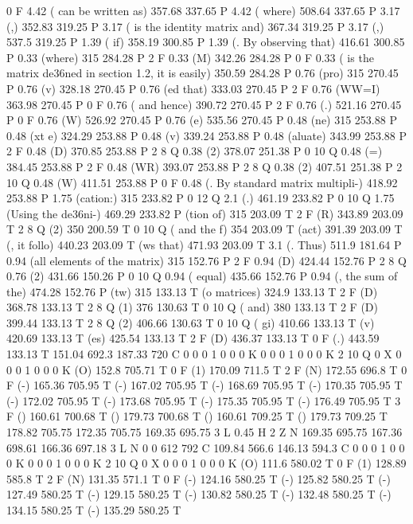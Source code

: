 0 F
4.42 ( can be written as) 357.68 337.65 P
4.42 ( where) 508.64 337.65 P
3.17 (,) 352.83 319.25 P
3.17 ( is the identity matrix and) 367.34 319.25 P
3.17 (,) 537.5 319.25 P
1.39 ( if) 358.19 300.85 P
1.39 (. By observing that) 416.61 300.85 P
0.33 (where) 315 284.28 P
2 F
0.33 (M) 342.26 284.28 P
0 F
0.33 ( is the matrix de\336ned in section 1.2, it is easily) 350.59 284.28 P
0.76 (pro) 315 270.45 P
0.76 (v) 328.18 270.45 P
0.76 (ed that) 333.03 270.45 P
2 F
0.76 (WW=I) 363.98 270.45 P
0 F
0.76 ( and hence) 390.72 270.45 P
2 F
0.76 (.) 521.16 270.45 P
0 F
0.76 (W) 526.92 270.45 P
0.76 (e) 535.56 270.45 P
0.48 (ne) 315 253.88 P
0.48 (xt e) 324.29 253.88 P
0.48 (v) 339.24 253.88 P
0.48 (aluate) 343.99 253.88 P
2 F
0.48 (D) 370.85 253.88 P
2 8 Q
0.38 (2) 378.07 251.38 P
0 10 Q
0.48 (=) 384.45 253.88 P
2 F
0.48 (WR) 393.07 253.88 P
2 8 Q
0.38 (2) 407.51 251.38 P
2 10 Q
0.48 (W) 411.51 253.88 P
0 F
0.48 (. By standard matrix multipli-) 418.92 253.88 P
1.75 (cation:) 315 233.82 P
0 12 Q
2.1 (.) 461.19 233.82 P
0 10 Q
1.75 (Using the de\336ni-) 469.29 233.82 P
(tion of) 315 203.09 T
2 F
(R) 343.89 203.09 T
2 8 Q
(2) 350 200.59 T
0 10 Q
( and the f) 354 203.09 T
(act) 391.39 203.09 T
(, it follo) 440.23 203.09 T
(ws that) 471.93 203.09 T
3.1 (. Thus) 511.9 181.64 P
0.94 (all elements of the matrix) 315 152.76 P
2 F
0.94 (D) 424.44 152.76 P
2 8 Q
0.76 (2) 431.66 150.26 P
0 10 Q
0.94 ( equal) 435.66 152.76 P
0.94 (, the sum of the) 474.28 152.76 P
(tw) 315 133.13 T
(o matrices) 324.9 133.13 T
2 F
(D) 368.78 133.13 T
2 8 Q
(1) 376 130.63 T
0 10 Q
( and) 380 133.13 T
2 F
(D) 399.44 133.13 T
2 8 Q
(2) 406.66 130.63 T
0 10 Q
( gi) 410.66 133.13 T
(v) 420.69 133.13 T
(es) 425.54 133.13 T
2 F
(D) 436.37 133.13 T
0 F
(.) 443.59 133.13 T
151.04 692.3 187.33 720 C
0 0 0 1 0 0 0 K
0 0 0 1 0 0 0 K
2 10 Q
0 X
0 0 0 1 0 0 0 K
(O) 152.8 705.71 T
0 F
(1) 170.09 711.5 T
2 F
(N) 172.55 696.8 T
0 F
(-) 165.36 705.95 T
(-) 167.02 705.95 T
(-) 168.69 705.95 T
(-) 170.35 705.95 T
(-) 172.02 705.95 T
(-) 173.68 705.95 T
(-) 175.35 705.95 T
(-) 176.49 705.95 T
3 F
() 160.61 700.68 T
() 179.73 700.68 T
() 160.61 709.25 T
() 179.73 709.25 T
178.82 705.75 172.35 705.75 169.35 695.75 3 L
0.45 H
2 Z
N
169.35 695.75 167.36 698.61 166.36 697.18 3 L
N
0 0 612 792 C
109.84 566.6 146.13 594.3 C
0 0 0 1 0 0 0 K
0 0 0 1 0 0 0 K
2 10 Q
0 X
0 0 0 1 0 0 0 K
(O) 111.6 580.02 T
0 F
(1) 128.89 585.8 T
2 F
(N) 131.35 571.1 T
0 F
(-) 124.16 580.25 T
(-) 125.82 580.25 T
(-) 127.49 580.25 T
(-) 129.15 580.25 T
(-) 130.82 580.25 T
(-) 132.48 580.25 T
(-) 134.15 580.25 T
(-) 135.29 580.25 T
